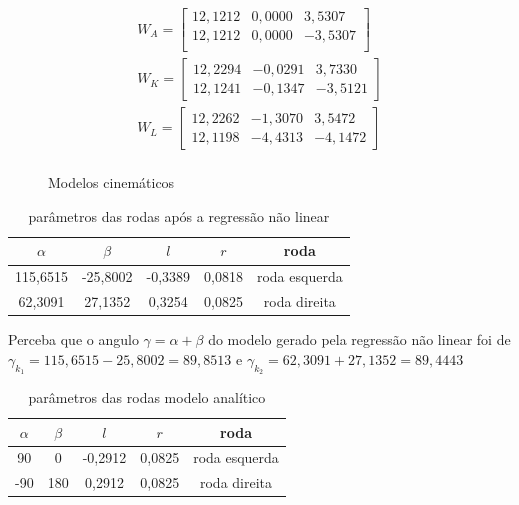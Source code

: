 \begin{figure}[H]
    \label{fig:parametros:da:cinemantica}
    \begin{align*}
        W_{A} = 
        \begin{bmatrix}
            12,1212 &  0,0000 & 3,5307 \\
            12,1212 &  0,0000 & -3,5307 \\
        \end{bmatrix}\\
        W_{K} = 
        \begin{bmatrix}
            12,2294 &  -0,0291 & 3,7330 \\
            12,1241 &  -0,1347 & -3,5121
        \end{bmatrix}\\
        W_{L} = 
        \begin{bmatrix}
            12,2262 &  -1,3070 & 3,5472 \\
            12,1198 &  -4,4313 & -4,1472
        \end{bmatrix}\\
    \end{align*}
    \caption{Modelos cinemáticos}
\end{figure}

\begin{table}[H]
    \label{table:param:kinematic}
    \centering
    \begin{tabular}{c|c|c|c|c}
        \hline
         $\alpha$ &$\beta$ &$l$ &$r$ & roda \\
        \hline
        115,6515 &-25,8002 &-0,3389 &0,0818 & roda esquerda \\
        \hline
        62,3091  &27,1352 &0,3254 &0,0825 & roda direita \\
        \hline
    \end{tabular}
    \caption{parâmetros das rodas após a regressão não linear}
\end{table}
Perceba que o angulo $\gamma = \alpha + \beta$ do modelo gerado pela regressão não
linear foi de $\gamma_{k_1} = 115,6515 -25,8002  = 89,8513$ e 
$\gamma_{k_2} = 62,3091 +27,1352 = 89,4443$
\begin{table}[H]
    \label{table:param:analytic}
    \centering
    \begin{tabular}{c|c|c|c|c}
        \hline
         $\alpha$ &$\beta$ &$l$ &$r$ & roda \\
        \hline
        90 & 0 &-0,2912 &0,0825 & roda esquerda \\
        \hline
        -90  & 180 & 0,2912 &0,0825 & roda direita \\
        \hline
    \end{tabular}
    \caption{parâmetros das rodas modelo analítico}
\end{table}



